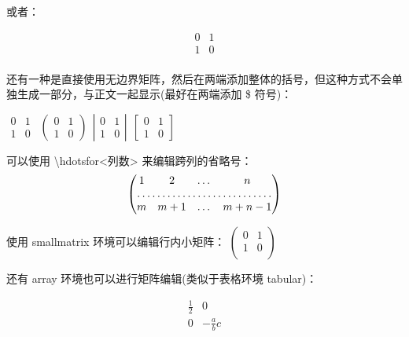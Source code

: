 \documentclass[UTF8]{ctexart}   %
\begin{document}
    或者：

    \[\begin{matrix}
        0 & 1 \\ 1 & 0 \\
    \end{matrix}\]

    还有一种是直接使用无边界矩阵，然后在两端添加整体的括号，但这种方式不会单独生成一部分，与正文一起显示(最好在两端添加 \$ 符号)：

    $\begin{matrix}
        0 & 1 \\ 1 & 0
    \end{matrix}~~
    \left(\begin{matrix}
        0 & 1 \\ 1 & 0
    \end{matrix}\right)~~
    \left|\begin{matrix}
        0 & 1 \\ 1 & 0
    \end{matrix}\right|~~
    \left[\begin{matrix}
        0 & 1 \\ 1 & 0
    \end{matrix}\right]$
    
    可以使用 \textbackslash hdotsfor{<列数>} 来编辑跨列的省略号：
    \[
        \begin{pmatrix}
            1 & 2 & \dots & n \\
            \hdotsfor{4} \\
            m & m+1 & \dots & m+n-1 \\
        \end{pmatrix}    
    \]

    使用 smallmatrix 环境可以编辑行内小矩阵：
    \begin{math}
    \left(      %
    \begin{smallmatrix}
    0 & 1 \\ 1 & 0 \\
    \end{smallmatrix}
    \right)
    \end{math}
    
    还有 array 环境也可以进行矩阵编辑(类似于表格环境 tabular)：

    \[
    \begin{array}{r|r}
    \frac{1}{2} & 0 \\ \hline
    0 & -\frac{a}{b}c \\
    \end{array}  
    \]
    
\end{document}
